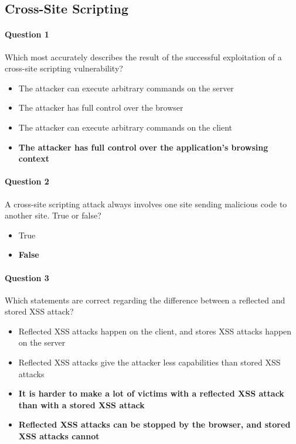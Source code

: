 \documentclass[titlepage]{article}
\begin{document}
    \subsection{Cross-Site Scripting}
    \paragraph{Question 1} Which most accurately describes the result of the successful exploitation of a cross-site scripting vulnerability?
    \begin{itemize}
        \item The attacker can execute arbitrary commands on the server
        \item The attacker has full control over the browser
        \item The attacker can execute arbitrary commands on the client
        \item \textbf{The attacker has full control over the application's browsing context} \checkmark
    \end{itemize}
    \paragraph{Question 2} A cross-site scripting attack always involves one site sending malicious code to another site. True or false?
    \begin{itemize}
        \item True
        \item \textbf{False} \checkmark
    \end{itemize}
    \paragraph{Question 3} Which statements are correct regarding the difference between a reflected and stored XSS attack?
    \begin{itemize}
        \item Reflected XSS attacks happen on the client, and stores XSS attacks happen on the server
        \item Reflected XSS attacks give the attacker less capabilities than stored XSS attacks
        \item \textbf{It is harder to make a lot of victims with a reflected XSS attack than with a stored XSS attack} \checkmark
        \item \textbf{Reflected XSS attacks can be stopped by the browser, and stored XSS attacks cannot} \checkmark
    \end{itemize}
\end{document}
